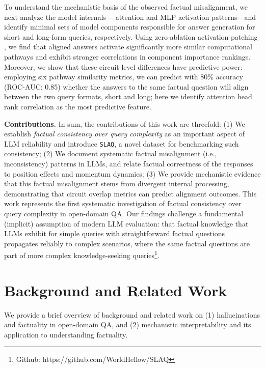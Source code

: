 \documentclass[11pt]{article}
\newcommand{\sparagraph}[1]{\vspace{0.0mm}\noindent\textbf{#1}}
\newcommand{\acrnm}{\texttt{SLAQ}\xspace}
\begin{document}
To understand the mechanistic basis of the observed factual misalignment, we next analyze the model internals--- attention and MLP activation patterns---and identify minimal sets of model components responsible for answer generation for short and long-form queries, respectively. Using zero-ablation \cite{olsson2022context} activation patching \cite{meng2022locating}, we find that aligned answers activate significantly more similar computational pathways and exhibit stronger correlations in component importance rankings. 
Moreover, we show that these circuit-level differences have predictive power: employing six pathway similarity metrics, we can predict with 80\% accuracy (ROC-AUC: 0.85) whether the answers to the same factual question will align between the two query formats, short and long; here we identify attention head rank correlation as the most predictive feature.



\sparagraph{Contributions.} In sum, the contributions of this work are threefold: (1) We establish \textit{factual consistency over query complexity} as an important aspect of LLM reliability and introduce \acrnm, a novel dataset for benchmarking such consistency; (2) We document systematic factual misalignment (i.e., inconsistency) patterns in LLMs, and relate factual correctness of the responses to position effects and momentum dynamics; (3) We provide mechanistic evidence that this factual misalignment stems from divergent internal processing, demonstrating that circuit overlap metrics can predict alignment outcomes.
%
This work represents the first systematic investigation of factual consistency over query complexity in open-domain QA. Our findings challenge a fundamental (implicit) assumption of modern LLM evaluation: that factual knowledge that LLMs exhibit for simple queries with straightforward factual questions propagates reliably to complex scenarios, where the same factual questions are part of more complex knowledge-seeking queries\footnote{Github: https://github.com/WorldHellow/SLAQ}.


\section{Background and Related Work}

We provide a brief overview of background and related work on (1) hallucinations and factuality in open-domain QA, and (2) mechanistic interpretability and its application to understanding factuality.
\end{document}
